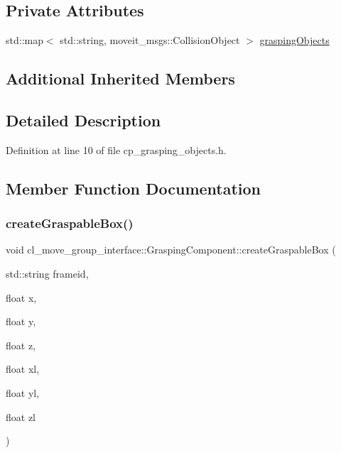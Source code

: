 \subsection*{Private Attributes}
\begin{DoxyCompactItemize}
\item 
std\+::map$<$ std\+::string, moveit\+\_\+msgs\+::\+Collision\+Object $>$ \hyperlink{classcl__move__group__interface_1_1GraspingComponent_a5e0364a3b76738fb263b11c4e1ef56cc}{grasping\+Objects}
\end{DoxyCompactItemize}
\subsection*{Additional Inherited Members}


\subsection{Detailed Description}


Definition at line 10 of file cp\+\_\+grasping\+\_\+objects.\+h.



\subsection{Member Function Documentation}
\mbox{\label{classcl__move__group__interface_1_1GraspingComponent_aac73eb5b4dc499998ad727cec8ffd48c}} 
\subsubsection{\texorpdfstring{create\+Graspable\+Box()}{createGraspableBox()}}
{\footnotesize\ttfamily void cl\+\_\+move\+\_\+group\+\_\+interface\+::\+Grasping\+Component\+::create\+Graspable\+Box (\begin{DoxyParamCaption}\item[{std\+::string}]{frameid,  }\item[{float}]{x,  }\item[{float}]{y,  }\item[{float}]{z,  }\item[{float}]{xl,  }\item[{float}]{yl,  }\item[{float}]{zl }\end{DoxyParamCaption})}



